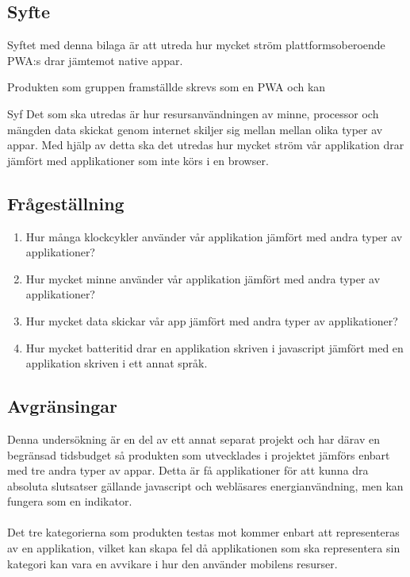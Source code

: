 \subsection{Syfte}
Syftet med denna bilaga är att utreda hur mycket ström plattformsoberoende PWA:s drar jämtemot native appar. 

Produkten som gruppen framställde skrevs som en PWA och kan 

Syf
Det som ska utredas är hur resursanvändningen av minne, processor och mängden data skickat genom internet skiljer sig mellan mellan olika typer av appar. Med hjälp av detta ska det utredas hur mycket ström vår applikation drar jämfört med applikationer som inte körs i en browser.

\subsection{Frågeställning}
\label{subsec:joel_a-research-questions}

\begin{enumerate}
\item Hur många klockcykler använder vår applikation jämfört med andra typer av applikationer?

\item Hur mycket minne använder vår applikation jämfört med andra typer av applikationer?

\item Hur mycket data skickar vår app jämfört med andra typer av applikationer?

\item Hur mycket batteritid drar en applikation skriven i javascript jämfört med en applikation skriven i ett annat språk.

\end{enumerate}

\subsection{Avgränsingar}
\label{subsec:joel_a-delimitations}

Denna undersökning är en del av ett annat separat projekt och har därav en begränsad tidsbudget så produkten som utvecklades i projektet jämförs enbart med tre andra typer av appar. Detta är få applikationer för att kunna dra absoluta slutsatser gällande javascript och webläsares energianvändning, men kan fungera som en indikator.\\\\
Det tre kategorierna som produkten testas mot kommer enbart att representeras av en applikation, vilket kan skapa fel då applikationen som ska representera sin kategori kan vara en avvikare i hur den använder mobilens resurser.

